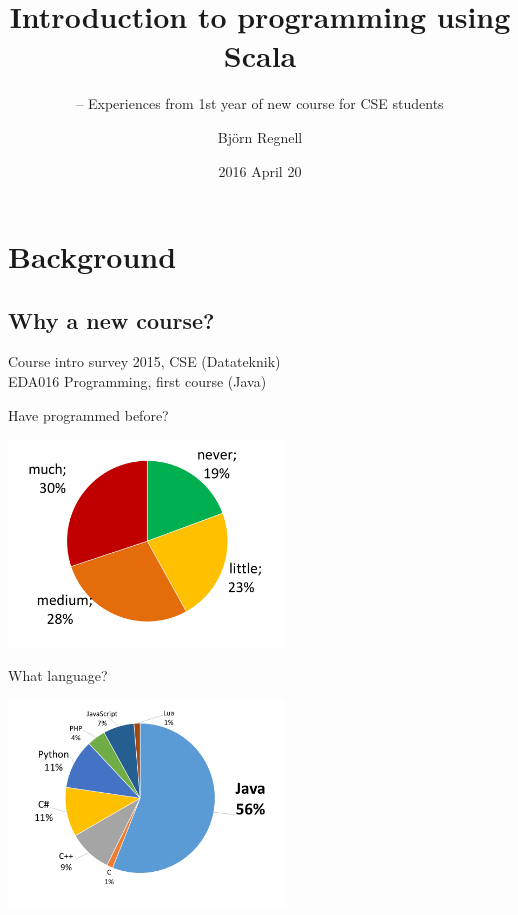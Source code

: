 \documentclass{lecturenotes}
\title[Scala introduktion]{Introduction to programming using Scala}
\subtitle{-- Experiences from 1st year of new course for CSE students}
\author{Björn Regnell}
\institute{Dept. of Computer Science, LTH \\ Lund University, Sweden}
\date{2016 April 20}
\begin{document}
\frame{\titlepage}


\section{Background}
\subsection{Why a new course?}


\begin{Slide}{Course intro survey 2015, CSE (Datateknik)\\EDA016 Programming, first course (Java)}
\begin{multicols}{2}
Have programmed before? \vspace{1em}

\includegraphics[width=0.55\textwidth]{img/survey-2015}
\columnbreak

\raggedleft What language?  \vspace{1em}

\includegraphics[width=0.55\textwidth]{img/lang-2015}
\end{multicols}
\end{Slide}
\end{document}
